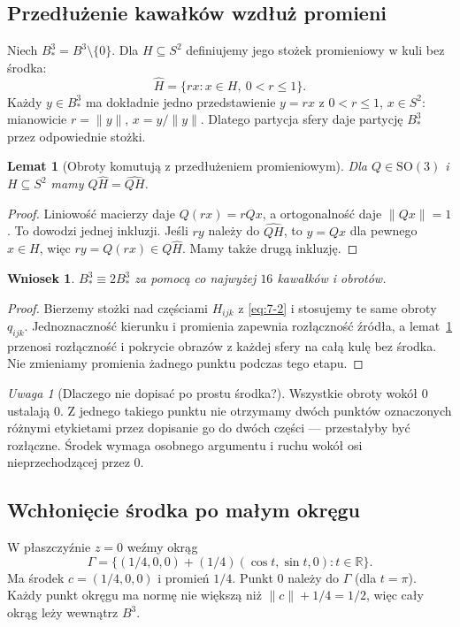 \documentclass[11pt,a4paper]{article}
\numberwithin{equation}{section}
\theoremstyle{plain}
\newtheorem{lemat}[twierdzenie]{Lemat}
\newtheorem{wniosek}[twierdzenie]{Wniosek}
\theoremstyle{definition}
\theoremstyle{remark}
\newtheorem{uwaga}[twierdzenie]{Uwaga}
\newcommand{\R}{\mathbb R}
\begin{document}
\subsection{Przedłużenie kawałków wzdłuż promieni}
Niech $B^3_*=B^3\setminus\{0\}$. Dla $H\subseteq S^2$ definiujemy jego stożek promieniowy w kuli bez środka:
\[
 \widehat H=\{rx:x\in H,\ 0<r\le1\}.
\]
Każdy $y\in B^3_*$ ma dokładnie jedno przedstawienie $y=rx$ z $0<r\le1$, $x\in S^2$: mianowicie $r=\|y\|$, $x=y/\|y\|$. Dlatego partycja sfery daje partycję $B^3_*$ przez odpowiednie stożki.
\begin{lemat}[Obroty komutują z przedłużeniem promieniowym]\label{lem:stozki}
Dla $Q\in\mathrm{SO}(3)$ i $H\subseteq S^2$ mamy $Q\widehat H=\widehat{QH}$.
\end{lemat}
\begin{proof}
Liniowość macierzy daje $Q(rx)=rQx$, a ortogonalność daje $\|Qx\|=1$. To dowodzi jednej inkluzji. Jeśli $ry$ należy do $\widehat{QH}$, to $y=Qx$ dla pewnego $x\in H$, więc $ry=Q(rx)\in Q\widehat H$. Mamy także drugą inkluzję.
\end{proof}
\begin{wniosek}\label{wn:kula-bez-srodka}
$B^3_*\equiv2B^3_*$ za pomocą co najwyżej $16$ kawałków i obrotów.
\end{wniosek}
\begin{proof}
Bierzemy stożki nad częściami $H_{ijk}$ z \eqref{eq:7-2} i stosujemy te same obroty $q_{ijk}$. Jednoznaczność kierunku i promienia zapewnia rozłączność źródła, a lemat~\ref{lem:stozki} przenosi rozłączność i pokrycie obrazów z każdej sfery na całą kulę bez środka. Nie zmieniamy promienia żadnego punktu podczas tego etapu.
\end{proof}
\begin{uwaga}[Dlaczego nie dopisać po prostu środka?]
Wszystkie obroty wokół $0$ ustalają $0$. Z jednego takiego punktu nie otrzymamy dwóch punktów oznaczonych różnymi etykietami przez dopisanie go do dwóch części --- przestałyby być rozłączne. Środek wymaga osobnego argumentu i ruchu wokół osi nieprzechodzącej przez $0$.
\end{uwaga}

\subsection{Wchłonięcie środka po małym okręgu}
W płaszczyźnie $z=0$ weźmy okrąg
\[
 \Gamma=\{(1/4,0,0)+(1/4)(\cos t,\sin t,0):t\in\R\}.
\]
Ma środek $c=(1/4,0,0)$ i promień $1/4$. Punkt $0$ należy do $\Gamma$ (dla $t=\pi$). Każdy punkt okręgu ma normę nie większą niż $\|c\|+1/4=1/2$, więc cały okrąg leży wewnątrz $B^3$.
\end{document}
